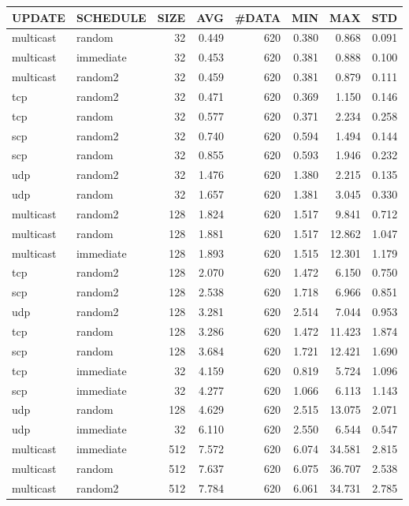 \begin{tabular}{|l|l|r|r|r|r|r|r|}
\hline
UPDATE & SCHEDULE & SIZE & AVG & \#DATA & MIN & MAX & STD\\
\hline
multicast & random & 32 & 0.449 & 620 & 0.380 & 0.868 & 0.091\\
multicast & immediate & 32 & 0.453 & 620 & 0.381 & 0.888 & 0.100\\
multicast & random2 & 32 & 0.459 & 620 & 0.381 & 0.879 & 0.111\\
tcp & random2 & 32 & 0.471 & 620 & 0.369 & 1.150 & 0.146\\
tcp & random & 32 & 0.577 & 620 & 0.371 & 2.234 & 0.258\\
scp & random2 & 32 & 0.740 & 620 & 0.594 & 1.494 & 0.144\\
scp & random & 32 & 0.855 & 620 & 0.593 & 1.946 & 0.232\\
udp & random2 & 32 & 1.476 & 620 & 1.380 & 2.215 & 0.135\\
udp & random & 32 & 1.657 & 620 & 1.381 & 3.045 & 0.330\\
multicast & random2 & 128 & 1.824 & 620 & 1.517 & 9.841 & 0.712\\
multicast & random & 128 & 1.881 & 620 & 1.517 & 12.862 & 1.047\\
multicast & immediate & 128 & 1.893 & 620 & 1.515 & 12.301 & 1.179\\
tcp & random2 & 128 & 2.070 & 620 & 1.472 & 6.150 & 0.750\\
scp & random2 & 128 & 2.538 & 620 & 1.718 & 6.966 & 0.851\\
udp & random2 & 128 & 3.281 & 620 & 2.514 & 7.044 & 0.953\\
tcp & random & 128 & 3.286 & 620 & 1.472 & 11.423 & 1.874\\
scp & random & 128 & 3.684 & 620 & 1.721 & 12.421 & 1.690\\
tcp & immediate & 32 & 4.159 & 620 & 0.819 & 5.724 & 1.096\\
scp & immediate & 32 & 4.277 & 620 & 1.066 & 6.113 & 1.143\\
udp & random & 128 & 4.629 & 620 & 2.515 & 13.075 & 2.071\\
udp & immediate & 32 & 6.110 & 620 & 2.550 & 6.544 & 0.547\\
multicast & immediate & 512 & 7.572 & 620 & 6.074 & 34.581 & 2.815\\
multicast & random & 512 & 7.637 & 620 & 6.075 & 36.707 & 2.538\\
multicast & random2 & 512 & 7.784 & 620 & 6.061 & 34.731 & 2.785\\

\end{tabular}
